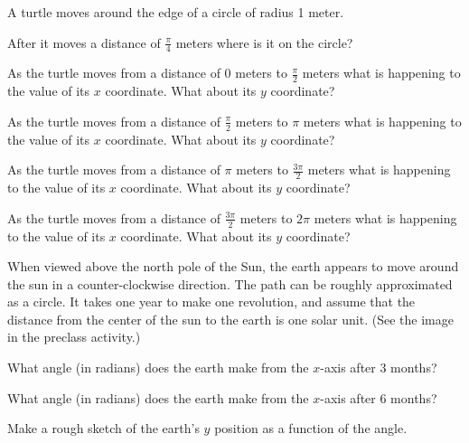 \begin{problem}
\item A turtle moves around the edge of a circle of radius 1 meter.
  \begin{subproblem}
    \item After it moves a distance of $\frac{\pi}{4}$ meters where is it on the circle?
    \vfill
    \item As the turtle moves from a distance of 0 meters to $\frac{\pi}{2}$ meters
      what is happening to the value of its $x$ coordinate. What about its $y$ coordinate?
    \vfill
    \item As the turtle moves from a distance of $\frac{\pi}{2}$ meters to $\pi$ meters
      what is happening to the value of its $x$ coordinate. What about its $y$ coordinate?
    \vfill
    \item As the turtle moves from a distance of $\pi$ meters to $\frac{3\pi}{2}$ meters
      what is happening to the value of its $x$ coordinate. What about its $y$ coordinate?
    \vfill
    \item As the turtle moves from a distance of $\frac{3\pi}{2}$ meters to $2\pi$ meters
      what is happening to the value of its $x$ coordinate. What about its $y$ coordinate?
    \vfill
  \end{subproblem}

\clearpage

\item When viewed above the north pole of the Sun, the earth appears
  to move around the sun in a counter-clockwise direction. The path
  can be roughly approximated as a circle. It takes
  one year to make one revolution, and assume that the distance from
  the center of the sun to the earth is one solar unit. (See the image
  in the preclass activity.)
  \begin{subproblem}
    \item What angle (in radians) does the earth make from the $x$-axis after 3
      months?
      \vfill
    \item What angle (in radians) does the earth make from the $x$-axis after 6
      months?
      \vfill
    \item Make a rough sketch of the earth's $y$ position as a
      function of the angle.

\end{subproblem}
\end{problem}
